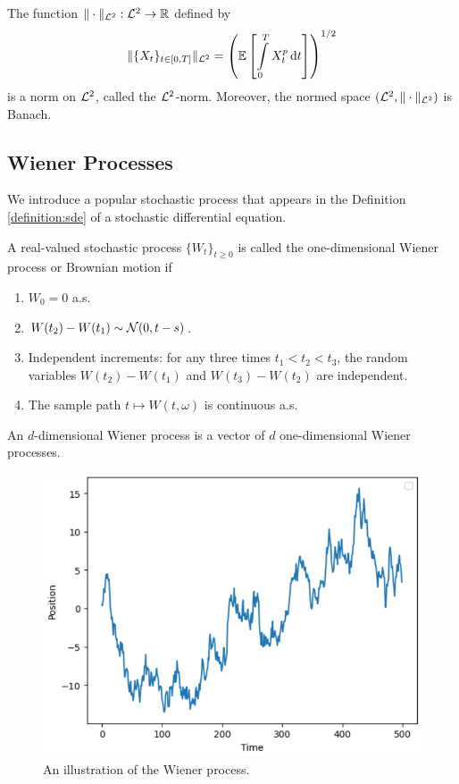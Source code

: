 \begin{theorem}
  The function $\|\cdot\|_{\mathcal{L}^2}:\mathcal{L}^2\to\mathbb{R}$ defined by
  \begin{equation}
    \|\{X_t\}_{t\in [0,T]}\|_{\mathcal{L}^2} = \left(\mathbb{E}\left[\int\limits_0^T X^p_t \,\mathrm{d} t\right]\right)^{1/2}
  \end{equation}
  is a norm on $\mathcal{L}^2$, called the $\mathcal{L}^2$-norm. Moreover, the normed space $(\mathcal{L}^2, \|\cdot\|_{\mathcal{L}^2})$ is Banach.
\end{theorem}



\subsection{Wiener Processes}

We introduce a popular stochastic process that appears in the Definition \ref{definition:sde} of a stochastic differential equation.

\begin{definition}
  \label{definition:wiener-process}
  A real-valued stochastic process $\{W_t\}_{t\ge0}$ is called the one-dimensional Wiener process or Brownian motion if
  \begin{enumerate}
    \item $W_0=0$ a.s.
    \item $W(t_2)-W(t_1) \sim \mathcal{N}(0,t-s)$.
    \item Independent increments: for any three times $t_1<t_2<t_3$, the random variables $W(t_2)-W(t_1)$ and $W(t_3)-W(t_2)$ are independent.
    \item The sample path $t\mapsto W(t,\omega)$  is continuous a.s.
  \end{enumerate}
  An $d$-dimensional Wiener process is a vector of $d$ one-dimensional Wiener processes.
\end{definition}

\begin{figure}
  \centering
  \includegraphics[width=0.5\linewidth]{img/1d-brownian.png}
  \vspace{0.5cm}
  \caption{An illustration of the Wiener process.}
  \label{figure:brownian-motion-illustration}
\end{figure}

